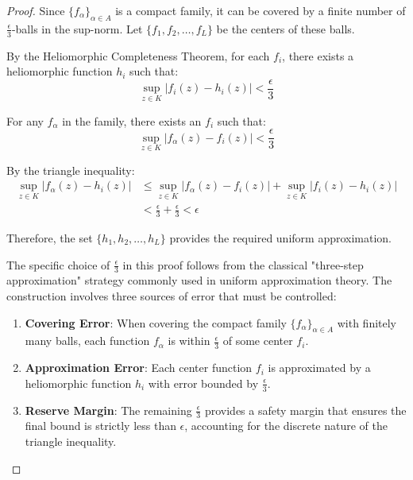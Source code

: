 \begin{proof}
Since $\{f_{\alpha}\}_{\alpha \in A}$ is a compact family, it can be covered by a finite number of $\frac{\epsilon}{3}$-balls in the sup-norm. Let $\{f_1, f_2, \ldots, f_L\}$ be the centers of these balls.

By the Heliomorphic Completeness Theorem, for each $f_i$, there exists a heliomorphic function $h_i$ such that:
\begin{equation}
\sup_{z \in K} |f_i(z) - h_i(z)| < \frac{\epsilon}{3}
\end{equation}

For any $f_{\alpha}$ in the family, there exists an $f_i$ such that:
\begin{equation}
\sup_{z \in K} |f_{\alpha}(z) - f_i(z)| < \frac{\epsilon}{3}
\end{equation}

By the triangle inequality:
\begin{align}
\sup_{z \in K} |f_{\alpha}(z) - h_i(z)| &\leq \sup_{z \in K} |f_{\alpha}(z) - f_i(z)| + \sup_{z \in K} |f_i(z) - h_i(z)|\\
&< \frac{\epsilon}{3} + \frac{\epsilon}{3} < \epsilon
\end{align}

Therefore, the set $\{h_1, h_2, \ldots, h_L\}$ provides the required uniform approximation.

\begin{remark}
The specific choice of $\frac{\epsilon}{3}$ in this proof follows from the classical "three-step approximation" strategy commonly used in uniform approximation theory. The construction involves three sources of error that must be controlled:

\begin{enumerate}
    \item \textbf{Covering Error}: When covering the compact family $\{f_{\alpha}\}_{\alpha \in A}$ with finitely many balls, each function $f_{\alpha}$ is within $\frac{\epsilon}{3}$ of some center $f_i$.
    
    \item \textbf{Approximation Error}: Each center function $f_i$ is approximated by a heliomorphic function $h_i$ with error bounded by $\frac{\epsilon}{3}$.
    
    \item \textbf{Reserve Margin}: The remaining $\frac{\epsilon}{3}$ provides a safety margin that ensures the final bound is strictly less than $\epsilon$, accounting for the discrete nature of the triangle inequality.
\end{enumerate}


\end{remark}
\end{proof}

